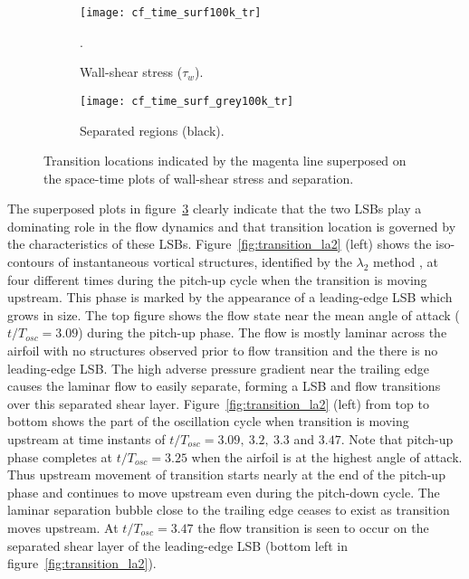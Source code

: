 \begin{figure}[h]
	\centering
	\begin{subfigure}[t]{0.46\textwidth}
		\centering
		\texttt{[image: cf\_time\_surf100k\_tr]}
		\caption{Wall-shear stress ($\tau_{w}$).}. 
		\label{fig:cf-time_tr}
	\end{subfigure}
	\begin{subfigure}[t]{0.45\textwidth}
		\centering
		\texttt{[image: cf\_time\_surf\_grey100k\_tr]}
		\caption{Separated regions (black).} 
		\label{fig:separation-time_tr}
	\end{subfigure}
	\caption{Transition locations indicated by the magenta line superposed on the space-time plots of wall-shear stress and separation.}
	\label{fig:space-time_tr}
\end{figure}

The superposed plots in figure~\ref{fig:space-time_tr} clearly indicate that the two LSBs play a dominating role in the flow dynamics and that transition location is governed by the characteristics of these LSBs. Figure~\ref{fig:transition_la2} (left) shows the iso-contours of instantaneous vortical structures, identified by the $\lambda_{2}$ method \citep{jeong95}, at four different times during the pitch-up cycle when the transition is moving upstream. This phase is marked by the appearance of a leading-edge LSB which grows in size. The top figure shows the flow state near the mean angle of attack ($t/T_{osc}=3.09$) during the pitch-up phase. The flow is mostly laminar across the airfoil with no structures observed prior to flow transition and the there is no leading-edge LSB. The high adverse pressure gradient near the trailing edge causes the laminar flow to easily separate, forming a LSB and flow transitions over this separated shear layer. Figure~\ref{fig:transition_la2} (left) from top to bottom shows the part of the oscillation cycle when transition is moving upstream at time instants of $t/T_{osc}=3.09,\ 3.2,\ 3.3$ and $3.47$. Note that pitch-up phase completes at $t/T_{osc}=3.25$ when the airfoil is at the highest angle of attack. Thus upstream movement of transition starts nearly at the end of the pitch-up phase and continues to move upstream even during the pitch-down cycle. The laminar separation bubble close to the trailing edge ceases to exist as transition moves upstream. At $t/T_{osc}=3.47$ the flow transition is seen to occur on the separated shear layer of the leading-edge LSB (bottom left in figure~\ref{fig:transition_la2}).

